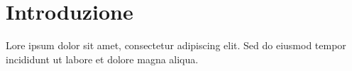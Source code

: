 \section{Introduzione}\label{sec:introduzione}
Lore ipsum dolor sit amet, consectetur adipiscing elit. Sed do eiusmod tempor incididunt ut labore et dolore magna aliqua.